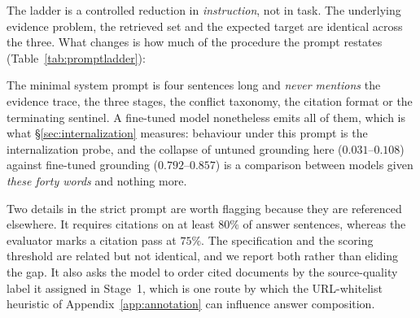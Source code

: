The ladder is a controlled reduction in \emph{instruction}, not in task. The
underlying evidence problem, the retrieved set and the expected target are
identical across the three. What changes is how much of the procedure the prompt
restates (Table~\ref{tab:promptladder}):

\begin{table}[htbp]
\caption{The three end-to-end instruction strengths, measured by system-prompt
length.}
\label{tab:promptladder}
\end{table}

The minimal system prompt is four sentences long and \emph{never mentions} the
evidence trace, the three stages, the conflict taxonomy, the citation format or
the terminating sentinel. A fine-tuned model nonetheless emits all of them, which
is what \S\ref{sec:internalization} measures: behaviour under this prompt is the
internalization probe, and the collapse of untuned grounding here
($0.031$--$0.108$) against fine-tuned grounding ($0.792$--$0.857$) is a comparison
between models given \emph{these forty words} and nothing more.

Two details in the strict prompt are worth flagging because they are referenced
elsewhere. It requires citations on at least $80\%$ of answer sentences, whereas
the evaluator marks a citation pass at $75\%$. The specification and the scoring
threshold are related but not identical, and we report both rather than eliding
the gap. It also asks the model to order cited documents by the source-quality
label it assigned in Stage~1, which is one route by which the URL-whitelist
heuristic of Appendix~\ref{app:annotation} can influence answer composition.

